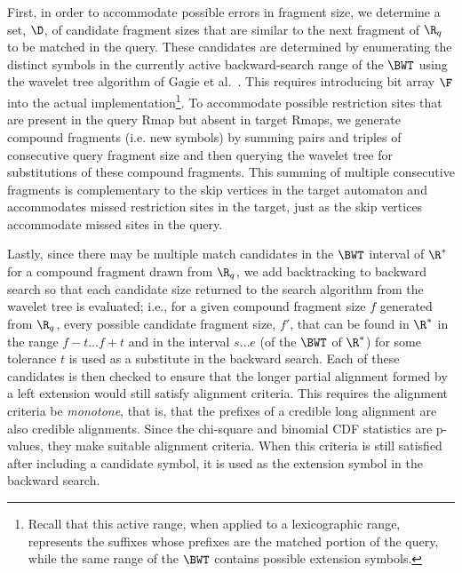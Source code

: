 \documentclass[doctor]{thesis}
\begin{document}
First, in order to accommodate possible errors in fragment size, we determine a set, $\D$, of candidate fragment sizes that are similar to the next fragment of $\R_q$ to be matched in the query. These candidates are determined by enumerating the distinct symbols in the currently active backward-search range of the $\BWT$ using the wavelet tree algorithm of Gagie et al.~\cite{GNPtcs11}.  This requires introducing bit array $\F$ into the actual implementation\footnote{Recall that this active range, when applied to a lexicographic range, represents the suffixes whose prefixes are the matched portion of the query, while the same range of the $\BWT$ contains possible extension symbols.}. To accommodate possible restriction sites that are present in the query Rmap but absent in target Rmaps, we generate compound fragments (i.e. new symbols) by summing pairs and triples of consecutive query fragment size and then querying the wavelet tree for substitutions of these compound fragments. This summing of multiple consecutive fragments is complementary to the skip vertices in the target automaton and accommodates missed restriction sites in the target, just as the skip vertices accommodate missed sites in the query.  





 

Lastly, since there may be multiple match candidates in the $\BWT$ interval of $\R^*$ 
for a compound fragment drawn from $\R_q$, we add backtracking to backward search so that each candidate size returned to the search algorithm from the wavelet tree is evaluated; i.e., for a given compound fragment size $f$ generated from $\R_q$, every possible candidate fragment size, $f'$, that can be found in $\R^*$ in the range $f - t \ldots f + t$ and in the interval $s \ldots e$ (of the $\BWT$ of $\R^*$) for some tolerance $t$ is used as a substitute in the backward search. Each of these candidates is then checked to ensure that the longer partial alignment formed by a left extension would still satisfy alignment criteria.  This requires the alignment criteria be \emph{monotone}, that is, that the prefixes of a credible long alignment are also credible alignments.  Since the chi-square and binomial CDF statistics are p-values, they make suitable alignment criteria.   When this criteria is still satisfied after including a candidate symbol, it is used as the extension symbol in the backward search.
 
 
\end{document}
